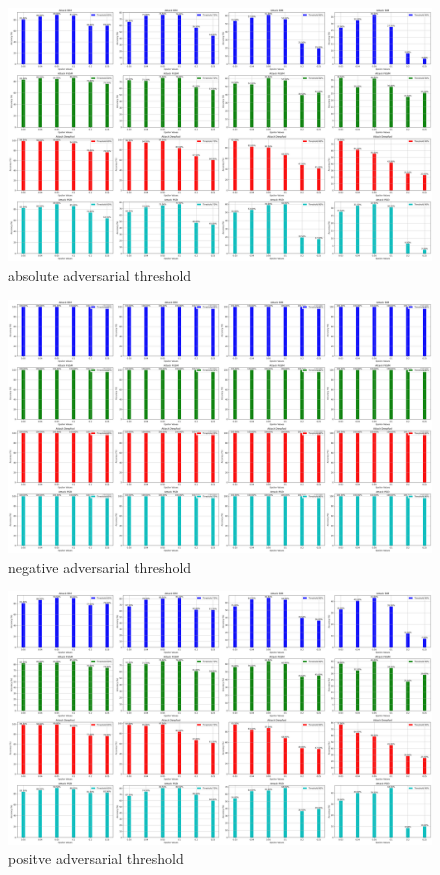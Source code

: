 \documentclass[10pt, conference, a4paper, final]{IEEEtran}
\begin{document}
        
            \begin{figure}
                \centering
                \includegraphics[width=\linewidth]{paper_images/aadversarial absolute threshold.png}
                \caption{absolute adversarial threshold}
                \label{fig:deep}
            \end{figure}
            \begin{figure}
                \centering
                \includegraphics[width=\linewidth]{paper_images/negative adversarial threshold.png}
                \caption{negative adversarial threshold}
                \label{fig:deep}
            \end{figure}
            \begin{figure}
                \centering
                \includegraphics[width=\linewidth]{paper_images/positve adversarial threshold.png}
                \caption{positve adversarial threshold}
                \label{fig:deep}
            \end{figure}
     
\end{document}
